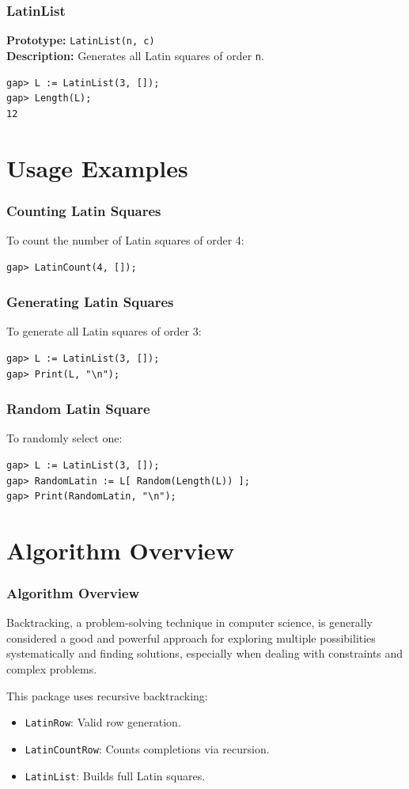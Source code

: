 \documentclass{beamer}
\begin{document}
\begin{frame}
\begin{frame}[fragile]
\frametitle{LatinList}
\textbf{Prototype:} \texttt{LatinList(n, c)}\\
\textbf{Description:} Generates all Latin squares of order \texttt{n}.
\begin{lstlisting}
gap> L := LatinList(3, []);
gap> Length(L);
12
\end{lstlisting}
\end{frame}

\section{Usage Examples}
\begin{frame}[fragile]
\frametitle{Counting Latin Squares}
To count the number of Latin squares of order 4:
\begin{lstlisting}
gap> LatinCount(4, []);
\end{lstlisting}
\end{frame}

\begin{frame}[fragile]
\frametitle{Generating Latin Squares}
To generate all Latin squares of order 3:
\begin{lstlisting}
gap> L := LatinList(3, []);
gap> Print(L, "\n");
\end{lstlisting}
\end{frame}

\begin{frame}[fragile]
\frametitle{Random Latin Square}
To randomly select one:
\begin{lstlisting}
gap> L := LatinList(3, []);
gap> RandomLatin := L[ Random(Length(L)) ];
gap> Print(RandomLatin, "\n");
\end{lstlisting}
\end{frame}

\section{Algorithm Overview}
\begin{frame}
\frametitle{Algorithm Overview}

Backtracking, a problem-solving technique in computer science, is generally considered a good and powerful approach for exploring multiple possibilities systematically and finding solutions, especially when dealing with constraints and complex problems. 

This package uses recursive backtracking:
\begin{itemize}
  \item \texttt{LatinRow}: Valid row generation.
  \item \texttt{LatinCountRow}: Counts completions via recursion.
  \item \texttt{LatinList}: Builds full Latin squares.
\end{itemize}
\end{frame}


\end{frame}
\end{document}
